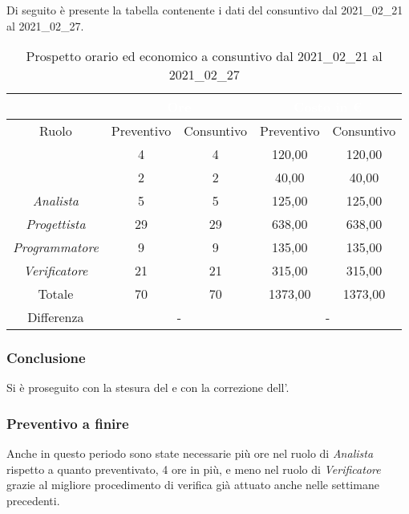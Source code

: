 Di seguito è presente la tabella contenente i dati del consuntivo dal 2021\_02\_21 al 2021\_02\_27.
\begin{table}[H]
	\centering
	\begin{tabular}{|c|c|c|c|c|}
		\rowcolor{darkblue} 
		&\multicolumn{2}{c|}{\textcolor{white}{Ore}}&\multicolumn{2}{c|}{\textcolor{white}{Costo in €}}\\ \hline
		Ruolo			&	Preventivo				&	Consuntivo		&	Preventivo	&	Consuntivo\\ \hline
		{\Responsabile}		&	4					&	4				&	120,00		&	120,00 \\ \hline
		{\Amministratore}	&	2					&	2				&	40,00		&	40,00 \\ \hline
		\textit{Analista}	&	5					&	5				&	125,00		&	125,00 \\ \hline
		\textit{Progettista}& 	29					&   29 				& 	638,00		&  	638,00 \\ \hline
		\textit{Programmatore}& 9					& 	9				& 	135,00		&  	135,00 \\ \hline
		\textit{Verificatore}&	21					&	21				&	315,00		&	315,00 \\ \hline
		Totale				&	70					&	70				&	1373,00		&	1373,00 \\ \hline
		Differenza			& 	\multicolumn{2}{c|}{-} 					&\multicolumn{2}{c|}{-}\\ \hline
	\end{tabular}
	\caption{Prospetto orario ed economico a consuntivo dal 2021\_02\_21 al 2021\_02\_27}
\end{table}
\subsubsection{Conclusione}
Si è proseguito con la stesura del  e con la correzione dell'\AdR{}.
\subsubsection{Preventivo a finire}
Anche in questo periodo sono state necessarie più ore nel ruolo di \textit{Analista} rispetto a quanto preventivato, 4 ore in più, e meno nel ruolo di \textit{Verificatore} grazie al migliore procedimento di verifica già attuato anche nelle settimane precedenti.

